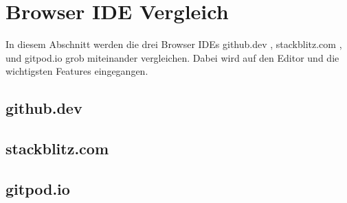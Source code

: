 \section{Browser IDE Vergleich}
In diesem Abschnitt werden die drei Browser IDEs
github.dev \cite{githubDevWebsite},
stackblitz.com \cite{stackblitzcomWebsite},
und
gitpod.io \cite{gitpodioWebsite}
grob miteinander vergleichen.
Dabei wird auf den Editor und die wichtigsten Features eingegangen.

\subsection{github.dev}

\subsection{stackblitz.com}

\subsection{gitpod.io}


